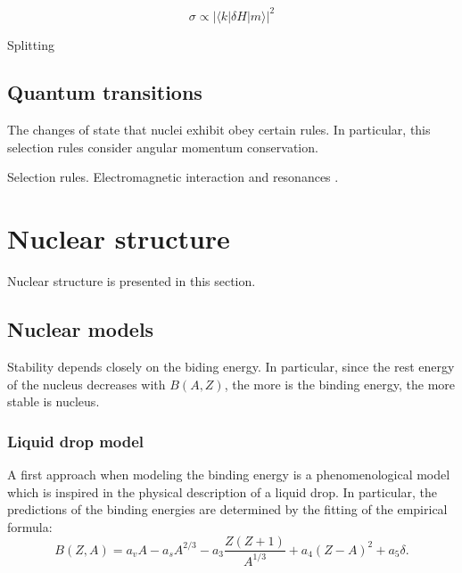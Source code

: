\documentclass[openany]{book}
\begin{document}
\begin{equation} \label{eq:crossSection_perturbation}
	\sigma \propto |\langle k | \delta H|m \rangle|^2
\end{equation}

Splitting 



\subsection{Quantum transitions} \label{sub:quantumTransitions}

The changes of state that nuclei exhibit obey certain rules. In particular, this selection rules consider angular momentum conservation. 



Selection rules. Electromagnetic interaction and resonances \cite{sasaki_kawano_stetcu_2022}.

\section{Nuclear structure} \label{sec:nuclearStructure}

Nuclear structure is presented in this section.

\subsection{Nuclear models}  \label{sub:nuclearModels}

Stability depends closely on the biding energy. In particular, since the rest energy of the nucleus decreases with $B(A, Z)$, the more is the binding energy, the more stable is nucleus.

\subsubsection{Liquid drop model} \label{ssub:liquidDropModel}

A first approach when modeling the binding energy is a phenomenological model which is inspired in the physical description of a liquid drop. In particular, the predictions of the binding energies are determined by the fitting of the empirical formula: \\ 

\begin{equation} \label{eq:liquidDrop_bindingEnergy}
	B(Z,A )= a_vA - a_sA^{2/3} - a_3 \frac{Z(Z+1)}{A^{1/3}} +  a_4(Z-A)^2 +   a_5 \delta.
\end{equation}
\end{document}

